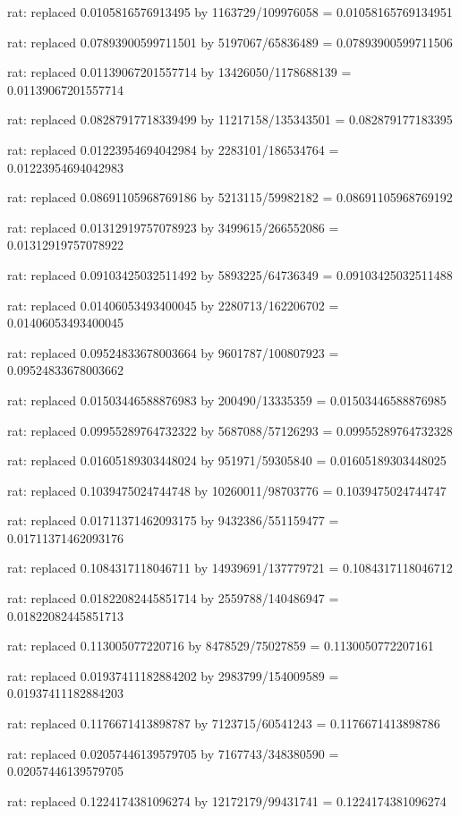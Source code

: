 \documentclass[a4paper,10pt]{article}
\begin{document}
\begin{eulernotebook}
\begin{eulercomment}
\begin{eulercomment}
\begin{eulercomment}
\begin{eulercomment}
\begin{eulercomment}
\begin{eulercomment}
\begin{eulercomment}
\begin{eulercomment}
\begin{eulercomment}
\begin{eulercomment}
\begin{eulercomment}
\begin{eulercomment}
\begin{eulercomment}
\begin{eulercomment}
\begin{eulercomment}
\begin{eulercomment}
\begin{euleroutput}
  rat: replaced 0.0105816576913495 by 1163729/109976058 = 0.01058165769134951
  
  rat: replaced 0.07893900599711501 by 5197067/65836489 = 0.07893900599711506
  
  rat: replaced 0.01139067201557714 by 13426050/1178688139 = 0.01139067201557714
  
  rat: replaced 0.08287917718339499 by 11217158/135343501 = 0.082879177183395
  
  rat: replaced 0.01223954694042984 by 2283101/186534764 = 0.01223954694042983
  
  rat: replaced 0.08691105968769186 by 5213115/59982182 = 0.08691105968769192
  
  rat: replaced 0.01312919757078923 by 3499615/266552086 = 0.01312919757078922
  
  rat: replaced 0.09103425032511492 by 5893225/64736349 = 0.09103425032511488
  
  rat: replaced 0.01406053493400045 by 2280713/162206702 = 0.01406053493400045
  
  rat: replaced 0.09524833678003664 by 9601787/100807923 = 0.09524833678003662
  
  rat: replaced 0.01503446588876983 by 200490/13335359 = 0.01503446588876985
  
  rat: replaced 0.09955289764732322 by 5687088/57126293 = 0.09955289764732328
  
  rat: replaced 0.01605189303448024 by 951971/59305840 = 0.01605189303448025
  
  rat: replaced 0.1039475024744748 by 10260011/98703776 = 0.1039475024744747
  
  rat: replaced 0.01711371462093175 by 9432386/551159477 = 0.01711371462093176
  
  rat: replaced 0.1084317118046711 by 14939691/137779721 = 0.1084317118046712
  
  rat: replaced 0.01822082445851714 by 2559788/140486947 = 0.01822082445851713
  
  rat: replaced 0.113005077220716 by 8478529/75027859 = 0.1130050772207161
  
  rat: replaced 0.01937411182884202 by 2983799/154009589 = 0.01937411182884203
  
  rat: replaced 0.1176671413898787 by 7123715/60541243 = 0.1176671413898786
  
  rat: replaced 0.02057446139579705 by 7167743/348380590 = 0.02057446139579705
  
  rat: replaced 0.1224174381096274 by 12172179/99431741 = 0.1224174381096274
  

\end{euleroutput}
\end{eulercomment}
\end{eulercomment}
\end{eulercomment}
\end{eulercomment}
\end{eulercomment}
\end{eulercomment}
\end{eulercomment}
\end{eulercomment}
\end{eulercomment}
\end{eulercomment}
\end{eulercomment}
\end{eulercomment}
\end{eulercomment}
\end{eulercomment}
\end{eulercomment}
\end{eulercomment}
\end{eulernotebook}
\end{document}
